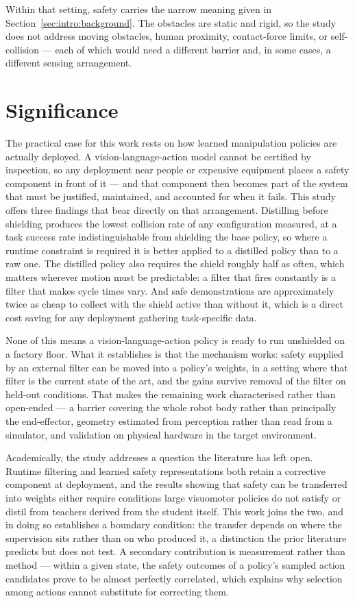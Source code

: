 \documentclass[a4paper,11pt]{report}
\begin{document}
Within that setting, safety carries the narrow meaning given in Section~\ref{sec:intro:background}.
The obstacles are static and rigid, so the study does not address moving obstacles, human proximity,
contact-force limits, or self-collision --- each of which would need a different barrier and, in
some cases, a different sensing arrangement.

\section{Significance}

The practical case for this work rests on how learned manipulation policies are actually deployed.
A vision-language-action model cannot be certified by inspection, so any deployment near people or
expensive equipment places a safety component in front of it --- and that component then becomes
part of the system that must be justified, maintained, and accounted for when it fails. This study
offers three findings that bear directly on that arrangement. Distilling before shielding produces
the lowest collision rate of any configuration measured, at a task success rate indistinguishable
from shielding the base policy, so where a runtime constraint is required it is better applied to a
distilled policy than to a raw one. The distilled policy also requires the shield roughly half as
often, which matters wherever motion must be predictable: a filter that fires constantly is a filter
that makes cycle times vary. And safe demonstrations are approximately twice as cheap to collect
with the shield active than without it, which is a direct cost saving for any deployment gathering
task-specific data.

None of this means a vision-language-action policy is ready to run unshielded on a factory floor.
What it establishes is that the mechanism works: safety supplied by an external filter can be moved
into a policy's weights, in a setting where that filter is the current state of the art, and the
gains survive removal of the filter on held-out conditions. That makes the remaining work
characterised rather than open-ended --- a barrier covering the whole robot body rather than
principally the end-effector, geometry estimated from perception rather than read from a simulator,
and validation on physical hardware in the target environment.

Academically, the study addresses a question the literature has left open. Runtime filtering and
learned safety representations both retain a corrective component at deployment, and the results
showing that safety can be transferred into weights either require conditions large visuomotor
policies do not satisfy or distil from teachers derived from the student itself. This work joins the
two, and in doing so establishes a boundary condition: the transfer depends on where the
supervision sits rather than on who produced it, a distinction the prior literature predicts but
does not test. A secondary contribution is measurement rather than method --- within a given state,
the safety outcomes of a policy's sampled action candidates prove to be almost perfectly correlated,
which explains why selection among actions cannot substitute for correcting them.
\end{document}
